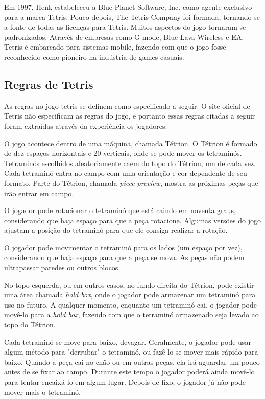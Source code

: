 \documentclass[
	12pt,				%
	openright,			%
	oneside,			%
	a4paper,			%
	brazil,				%
	]{abntex2}
\begin{document}
Em 1997, Henk estabeleceu a Blue Planet Software, Inc. como agente exclusivo para a marca Tetris. Pouco depois, The Tetris Company foi formada, tornando-se a fonte de todas as licenças para Tetris. Muitos aspectos do jogo tornaram-se padronizados. Através de empresas como G-mode, Blue Lava Wireless e EA, Tetris é embarcado para sistemas mobile, fazendo com que o jogo fosse reconhecido como pioneiro na indústria de games casuais.

\subsection{Regras de Tetris}

As regras no jogo tetris se definem como especificado a seguir. O site oficial de Tetris não especificam as regras do jogo, e portanto essas regras citadas a seguir foram extraídas através da experiência os jogadores.

O jogo acontece dentro de uma máquina, chamada Tétrion. O Tétrion é formado de dez espaços horizontais e 20 verticais, onde se pode mover os tetraminós. Tetraminós escolhidos aleatoriamente caem do topo do Tétrion, um de cada vez. Cada tetraminó entra no campo com uma orientação e cor dependente de seu formato. Parte do Tétrion, chamada \textit{piece preview}, mostra as próximas peças que irão entrar em campo.

O jogador pode rotacionar o tetraminó que está caindo em noventa graus, considerando que haja espaço para que a peça rotacione. Algumas versões do jogo ajustam a posição do tetraminó para que ele consiga realizar a rotação.

O jogador pode movimentar o tetraminó para os lados (um espaço por vez), considerando que haja espaço para que a peça se mova. As peças não podem ultrapassar paredes ou outros blocos.

No topo-esquerda, ou em outros casos, no fundo-direita do Tétrion, pode existir uma área chamada \textit{hold box}, onde o jogador pode armazenar um tetraminó para uso no futuro. A qualquer momento, enquanto um tetraminó cai, o jogador pode movê-lo para a \textit{hold box}, fazendo com que o tetraminó armazenado seja levado ao topo do Tétrion.

Cada tetraminó se move para baixo, devagar. Geralmente, o jogador pode usar algum método para "derrubar" o tetraminó, ou fazê-lo se mover mais rápido para baixo. Quando a peça cai no chão ou em outras peças, ela irá aguardar um pouco antes de se fixar ao campo. Durante este tempo o jogador poderá ainda movê-lo para tentar encaixá-lo em algum lugar. Depois de fixo, o jogador já não pode mover mais o tetraminó.
\end{document}
